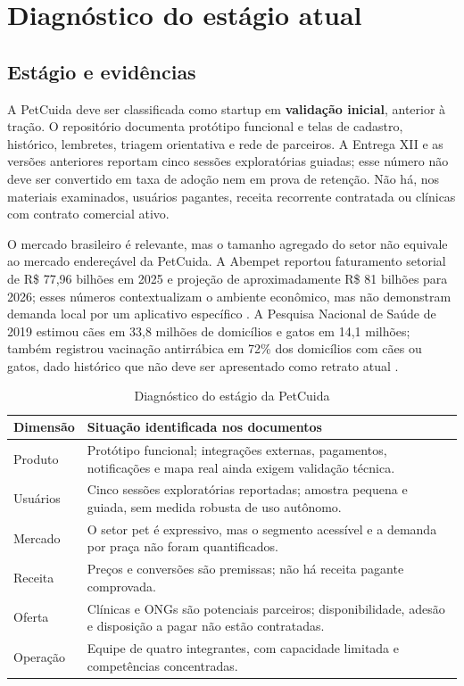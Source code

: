 \section{Diagnóstico do estágio atual}
\subsection{Estágio e evidências}
A PetCuida deve ser classificada como startup em \textbf{validação inicial}, anterior à tração. O repositório documenta protótipo funcional e telas de cadastro, histórico, lembretes, triagem orientativa e rede de parceiros. A Entrega XII e as versões anteriores reportam cinco sessões exploratórias guiadas; esse número não deve ser convertido em taxa de adoção nem em prova de retenção. Não há, nos materiais examinados, usuários pagantes, receita recorrente contratada ou clínicas com contrato comercial ativo.

O mercado brasileiro é relevante, mas o tamanho agregado do setor não equivale ao mercado endereçável da PetCuida. A Abempet reportou faturamento setorial de R\$ 77,96 bilhões em 2025 e projeção de aproximadamente R\$ 81 bilhões para 2026; esses números contextualizam o ambiente econômico, mas não demonstram demanda local por um aplicativo específico \cite{abempet2026,cnn2026}. A Pesquisa Nacional de Saúde de 2019 estimou cães em 33,8 milhões de domicílios e gatos em 14,1 milhões; também registrou vacinação antirrábica em 72\% dos domicílios com cães ou gatos, dado histórico que não deve ser apresentado como retrato atual \cite{ibge2020}.

\begin{table}[H]\centering
\caption{Diagnóstico do estágio da PetCuida}
\begin{tabularx}{\textwidth}{L{3.2cm}Y}
\toprule
Dimensão & Situação identificada nos documentos\\\midrule
Produto & Protótipo funcional; integrações externas, pagamentos, notificações e mapa real ainda exigem validação técnica.\\
Usuários & Cinco sessões exploratórias reportadas; amostra pequena e guiada, sem medida robusta de uso autônomo.\\
Mercado & O setor pet é expressivo, mas o segmento acessível e a demanda por praça não foram quantificados.\\
Receita & Preços e conversões são premissas; não há receita pagante comprovada.\\
Oferta & Clínicas e ONGs são potenciais parceiros; disponibilidade, adesão e disposição a pagar não estão contratadas.\\
Operação & Equipe de quatro integrantes, com capacidade limitada e competências concentradas.\\
\bottomrule
\end{tabularx}\fonteautores
\end{table}

